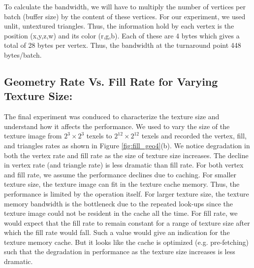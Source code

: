 To calculate the bandwidth, we will have to multiply the number of vertices per batch (buffer size) by the content of these vertices. For our experiment, we used unlit, untextured triangles. Thus, the information hold by each vertex is the position (x,y,z,w) and its color (r,g,b). Each of these are 4 bytes which gives a total of 28 bytes per vertex. Thus, the bandwidth at the turnaround point 448 bytes/batch. 



\subsection{Geometry Rate Vs. Fill Rate for Varying Texture Size:}
The final experiment was conduced to characterize the texture size and understand how it affects the performance. We used \protect{\wes} to vary the size of the texture image from $2^{3}\times2^{3}$ texels to $2^{12}\times2^{12}$ texels and recorded the vertex, fill, and triangles rates as shown in Figure \ref{fig:fill_geo4}(b). We notice degradation in both the vertex rate and fill rate as the size of texture size increases. The decline in vertex rate (and triangle rate) is less dramatic than fill rate. For both vertex and fill rate, we assume the performance declines due to caching. For smaller texture size, the texture image can fit in the texture cache memory. Thus, the performance is limited by the operation itself. For larger texture size, the texture memory bandwidth is the bottleneck due to the repeated look-ups since the texture image could not be resident in the cache all the time. For fill rate, we would expect that the fill rate to remain constant for a range of texture size after which the fill rate would fall. Such a value would give an indication for the texture memory cache. But it looks like the cache is optimized (e.g. pre-fetching) such that the degradation in performance as the texture size increases is less dramatic. 

